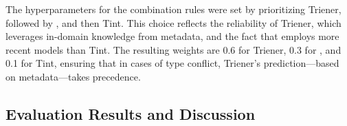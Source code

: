 
The hyperparameters for the combination rules were set by prioritizing Trie\ac{ner}, followed by \spacy, and then Tint. This choice reflects the reliability of Trie\ac{ner}, which leverages in-domain knowledge from metadata, and the fact that \spacy employs more recent models than Tint. The resulting weights are 0.6 for Trie\ac{ner}, 0.3 for \spacy, and 0.1 for Tint, ensuring that in cases of type conflict, Trie\ac{ner}'s prediction---based on metadata---takes precedence.



% 

\subsection{Evaluation Results and Discussion}\label{sec:results}


